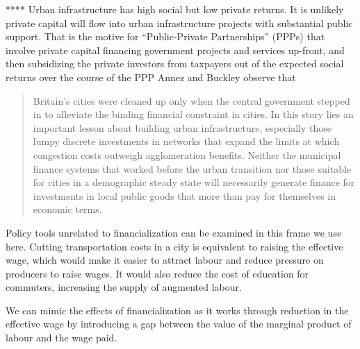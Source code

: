 ****  Urban infrastructure has high social but low private returns. It is unlikely private capital will flow into urban infrastructure projects with substantial public support. That is the motive for ``\gls{Public-Private Partnerships}'' (PPPs) that involve private capital financing government projects and services up-front, and then subsidizing the private investors  from taxpayers out of the expected social returns over the course of the PPP
Annez and Buckley\cite{annezUrbanizationGrowthSetting2009} observe that 
\begin{quotation}
Britain’s cities were cleaned up only when the central government stepped in to alleviate the binding financial constraint in cities. In this story lies an important lesson about building urban infrastructure, especially those lumpy discrete investments in networks that expand the limits at which congestion costs outweigh agglomeration benefits. Neither the municipal finance systems that worked before the urban transition nor those suitable for cities in a demographic steady state will necessarily generate finance for investments in local public goods that more than pay for themselves in economic terms. 
\end{quotation}









Policy tools unrelated to financialization can be examined in this  frame we use here. Cutting transportation costs in a city is equivalent to raising the effective wage, which would  make it easier to attract labour and reduce pressure on producers to raise wages. It would also reduce the cost of education for commuters, increasing the supply of augmented labour.



 We can mimic the effects of financialization as it works through reduction in the effective wage by introducing a gap between the value of the marginal product of labour and the wage paid. 

